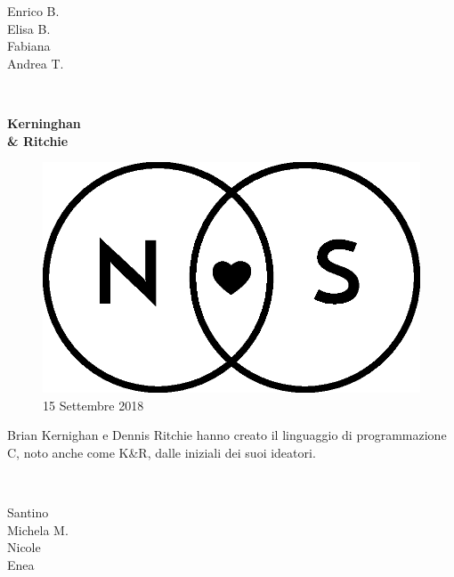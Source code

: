 \documentclass[20pt]{extarticle}
\begin{document}
\begin{center}
\begin{minipage}[c][\textheight]{83.1mm}
\raggedleft
{\Large Enrico B.\\
Elisa B.\\
Fabiana\\
Andrea T.\\}
\end{minipage}%
\begin{minipage}[c][\textheight]{10mm}
\raggedleft
{\ \\}
\end{minipage}%
\begin{minipage}[c][\textheight]{110.8mm}
\centering
{\LARGE \textbf{Kerninghan \\\& Ritchie}}\par\bigskip
\vfill
\begin{figure}[H]
\centering
\includegraphics[scale=0.5]{img/Logo_piccolo.eps}
\vfill
\small15 Settembre 2018\\
\end{figure}
\vfill
Brian Kernighan e Dennis Ritchie hanno creato il linguaggio di programmazione C, noto anche come K\&R, dalle iniziali dei suoi ideatori.
\vfill
\end{minipage}%
\begin{minipage}[c][\textheight]{10mm}
\raggedright
{\ \\}
\end{minipage}%
\begin{minipage}[c][\textheight]{83.1mm}
\raggedright
{\Large Santino\\
Michela M.\\
Nicole\\
Enea\\}
\end{minipage}
\end{center}
\end{document}
